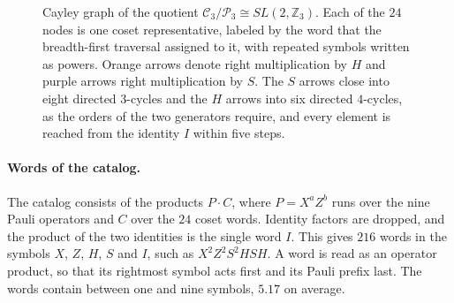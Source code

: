\begin{figure}[tp]
{
  }
  \caption{Cayley graph of the quotient $\mathcal{C}_3/\mathcal{P}_3 \cong SL(2,\mathbb{Z}_3)$. Each of the $24$ nodes is one coset representative, labeled by the word that the breadth-first traversal assigned to it, with repeated symbols written as powers. Orange arrows denote right multiplication by $H$ and purple arrows right multiplication by $S$. The $S$ arrows close into eight directed $3$-cycles and the $H$ arrows into six directed $4$-cycles, as the orders of the two generators require, and every element is reached from the identity $I$ within five steps.}
  \label{fig:cayley-c3modp3}
\end{figure}

\paragraph{Words of the catalog.}
The catalog consists of the products $P \cdot C$, where $P = X^a Z^b$ runs over the nine Pauli operators and $C$ over the $24$ coset words. Identity factors are dropped, and the product of the two identities is the single word $I$. This gives $216$ words in the symbols $X$, $Z$, $H$, $S$ and $I$, such as $X^2Z^2S^2HSH$. A word is read as an operator product, so that its rightmost symbol acts first and its Pauli prefix last. The words contain between one and nine symbols, $5.17$ on average.

